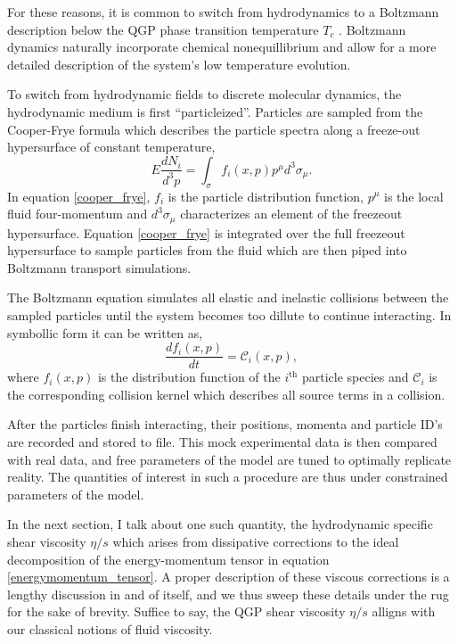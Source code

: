 \documentclass[aps,prc,reprint,amsmath,nofootinbib]{revtex4-1}
\begin{document}
For these reasons, it is common to switch from hydrodynamics to a Boltzmann description below the QGP phase transition temperature $T_c$ \cite{bass-dumitru}. Boltzmann dynamics naturally 
incorporate chemical nonequillibrium and allow for a more detailed description of the system's low temperature evolution.

To switch from hydrodynamic fields to discrete molecular dynamics, the hydrodynamic medium is first ``particleized''. Particles are sampled from the Cooper-Frye formula 
which describes the particle spectra along a freeze-out hypersurface of constant temperature,
\begin{equation}
 \label{cooper_frye}
 E \frac{dN_i}{d^3p} = \int_\sigma f_i(x,p) p^\mu d^3\sigma_\mu.
\end{equation}
In equation \ref{cooper_frye}, $f_i$ is the particle distribution function, $p^\mu$ is the local fluid four-momentum and $d^3\sigma_\mu$ characterizes an element of the freezeout hypersurface. Equation
\ref{cooper_frye} is integrated over the full freezeout hypersurface to sample particles from the fluid which are then piped into Boltzmann transport simulations.

The Boltzmann equation simulates all elastic and inelastic collisions between the sampled particles until the system becomes too dillute to continue interacting. In symbollic
form it can be written as,
\begin{equation}
 \label{boltzmann_eqn}
 \frac{df_i(x,p)}{dt} = \mathcal{C}_i (x,p),
\end{equation}
where $f_i(x,p)$ is the distribution function of the $i^\mathrm{th}$ particle species and $\mathcal{C}_i$ is the corresponding collision kernel which describes all source 
terms in a collision.

After the particles finish interacting, their positions, momenta and particle ID's are recorded and stored to file. This mock experimental data is then compared with real
data, and free parameters of the model are tuned to optimally replicate reality. The quantities of interest in such a procedure are thus under constrained parameters of 
the model. 

In the next section, I talk about one such quantity, the hydrodynamic specific shear viscosity $\eta/s$ which arises from dissipative corrections to the ideal decomposition of
the energy-momentum tensor in equation \ref{energymomentum_tensor}. A proper description of these viscous corrections is a lengthy discussion in and of itself, and we thus 
sweep these details under the rug for the sake of brevity. Suffice to say, the QGP shear viscosity $\eta/s$ alligns with our classical notions of fluid viscosity.
\end{document}
